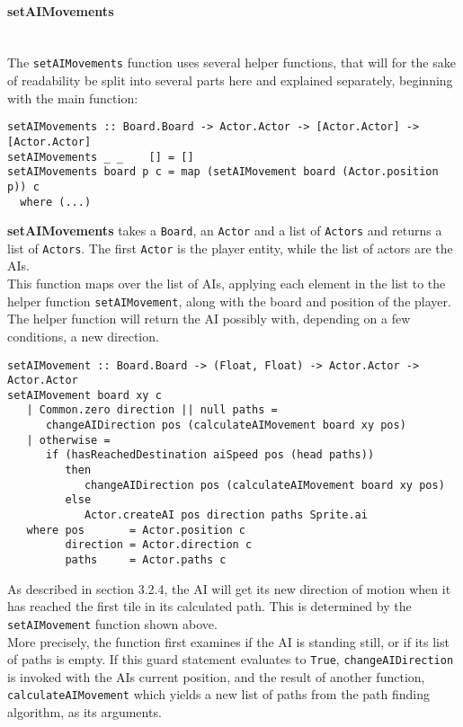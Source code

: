 \documentclass{article}
\begin{document}
		\paragraph{setAIMovements}\mbox{}\\ \newline
        The \texttt{setAIMovements} function uses several helper functions, that will for the sake of readability be split into several parts here and explained separately, beginning with the main function:
\begin{verbatim}
setAIMovements :: Board.Board -> Actor.Actor -> [Actor.Actor] -> [Actor.Actor]
setAIMovements _ _    [] = []
setAIMovements board p c = map (setAIMovement board (Actor.position p)) c
  where (...)
\end{verbatim}
		\textbf{setAIMovements} takes a \texttt{Board}, an \texttt{Actor} and a list of \texttt{Actors} and returns a list of \texttt{Actors}. The first \texttt{Actor} is the player entity, while the list of actors are the AIs. \\
        \newline This function maps over the list of AIs, applying each element in the list to the helper function \texttt{setAIMovement}, along with the board and position of the player. The helper function will return the AI possibly with, depending on a few conditions, a new direction. \\
\begin{verbatim}
setAIMovement :: Board.Board -> (Float, Float) -> Actor.Actor -> Actor.Actor
setAIMovement board xy c
   | Common.zero direction || null paths =
      changeAIDirection pos (calculateAIMovement board xy pos)
   | otherwise =
      if (hasReachedDestination aiSpeed pos (head paths))
         then
            changeAIDirection pos (calculateAIMovement board xy pos)
         else
            Actor.createAI pos direction paths Sprite.ai
   where pos       = Actor.position c
         direction = Actor.direction c
         paths     = Actor.paths c
\end{verbatim}
		As described in section 3.2.4, the AI will get its new direction of motion when it has reached the first tile in its calculated path. This is determined by the \texttt{setAIMovement} function shown above. \\
        \newline
        More precisely, the function first examines if the AI is standing still, or if its list of paths is empty. If this guard statement evaluates to \texttt{True}, \texttt{changeAIDirection} is invoked with the AIs current position, and the result of another function, \texttt{calculateAIMovement} which yields a new list of paths from the path finding algorithm, as its arguments. \\
\end{document}

